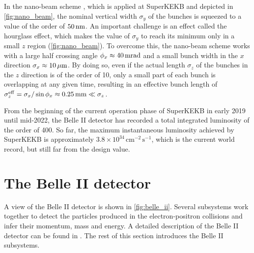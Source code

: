 In the nano-beam scheme \cite{SuperB:2007lel}, which is applied at SuperKEKB and depicted in \cref{fig:nano_beam}, the nominal vertical width $\sigma_y$ of the bunches is squeezed to a value of the order of $50\mathrm{\,nm}$.
An important challenge is an effect called the hourglass effect, which makes the value of $\sigma_y$ to reach its minimum only in a small $z$ region (\cref{fig:nano_beam}).
To overcome this, the nano-beam scheme works with a large half crossing angle $\phi_x\approx40\mathrm{\,mrad}$ and a small bunch width in the $x$ direction $\sigma_x\approx10{\,\mu\mathrm{m}}$.
By doing so, even if the actual length $\sigma_z$ of the bunches in the $z$ direction is of the order of 10\mm, only a small part of each bunch is overlapping at any given time, resulting in an effective bunch length of $\sigma^{\mathrm{eff}}_z=\sigma_x/\sin\phi_x\approx0.25\mathrm{\,mm}\ll\sigma_z$.


From the beginning of the current operation phase of SuperKEKB in early 2019 until mid-2022, the Belle II detector has recorded a total integrated luminosity of the order of 400\invfb.
So far, the maximum instantaneous luminosity achieved by SuperKEKB is approximately $3.8\times10^{34}\mathrm{\,cm^{-2}\,s^{-1}}$, which is the current world record, but still far from the design value.

\section{The Belle II detector} \label{sec:belleii}

A view of the  Belle II detector is shown in \cref{fig:belle_ii}.
Several subsystems work together to detect the particles produced in the electron-positron collisions and infer their momentum, mass and energy.
A detailed description of the Belle II detector can be found in \cite{Abe:2010gxa}.
The rest of this section introduces the Belle II subsystems.

